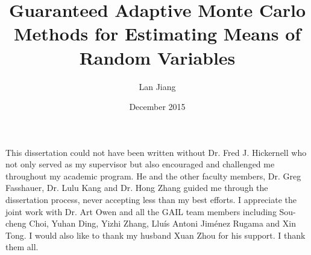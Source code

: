 \documentclass{iitthesis}
\theoremstyle{definition}
\begin{document}

\title{Guaranteed Adaptive Monte Carlo Methods for Estimating Means of Random Variables}
\author{Lan Jiang}
 
\date{December 2015}
\maketitle                %


\prelimpages         %


\begin{acknowledgement}     %
\par  This dissertation could not have been written without Dr. Fred
J. Hickernell who not only served as my supervisor but also encouraged and challenged me throughout my academic program. He and the other faculty members, Dr. Greg Fasshauer, Dr. Lulu Kang and Dr. Hong Zhang guided me through the dissertation process, never accepting less than my best efforts. I appreciate the joint work with Dr. Art Owen and all the GAIL team members including Sou-cheng Choi, Yuhan Ding, Yizhi Zhang, Llu{\'i}s Antoni Jim{\'e}nez Rugama and Xin Tong. I would also like to thank my husband Xuan Zhou for his support. I thank them all. 
\end{acknowledgement}


\tableofcontents
 \clearpage

\listoftables

\clearpage

\listoffigures

\clearpage
\end{document}
